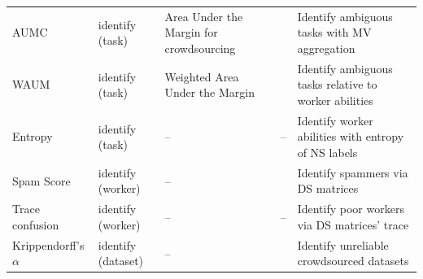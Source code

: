 \begin{center}
\begin{longtable}{|l|p{15mm}|p{35mm}|p{25mm}|p{40mm}|}
    AUMC & identify (task)& Area Under the Margin for crowdsourcing & \citet{lefort2022improve} & Identify ambiguous tasks with MV aggregation \\
    WAUM & identify (task)& Weighted Area Under the Margin & \citet{lefort2022improve} & Identify ambiguous tasks relative to worker abilities \\
    Entropy & identify (task) & -- & -- & Identify worker abilities with entropy of NS labels\\
    Spam Score & identify (worker) & -- & \citet{raykar_ranking_2011} & Identify spammers via DS matrices\\
    Trace confusion & identify (worker) & -- & -- & Identify poor workers via DS matrices' trace\\
    Krippendorff's $\alpha$ & identify (dataset) & -- & \citet{krippendorff1980validity} & Identify unreliable crowdsourced datasets\\
    \hline
    \end{longtable}
\end{center}
